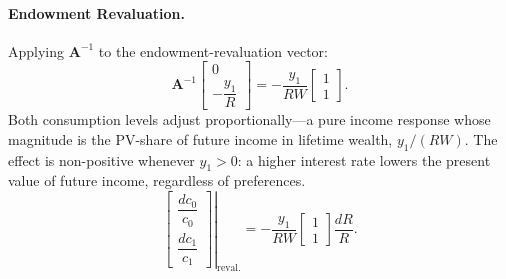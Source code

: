 \paragraph{Endowment Revaluation.}
Applying $\mathbf{A}^{-1}$ to the endowment-revaluation vector:
\begin{equation}
\mathbf{A}^{-1} \begin{bmatrix} 0 \\[4pt] -\dfrac{y_1}{R} \end{bmatrix}
= -\frac{y_1}{RW} \begin{bmatrix} 1 \\[4pt] 1 \end{bmatrix}.
\label{eq:wealth-effect-calc}
\end{equation}
Both consumption levels adjust proportionally---a pure income response whose magnitude is the PV-share of future income in lifetime wealth, $y_1/(RW)$. The effect is non-positive whenever $y_1 > 0$: a higher interest rate lowers the present value of future income, regardless of preferences.
\begin{equation}
\left.\begin{bmatrix} \dfrac{dc_0}{c_0} \\[8pt] \dfrac{dc_1}{c_1} \end{bmatrix}\right|_{\text{reval.}} = -\frac{y_1}{RW} \begin{bmatrix} 1 \\[4pt] 1 \end{bmatrix} \frac{dR}{R}.
\label{eq:income-effect}
\end{equation}

